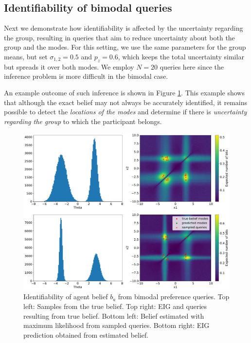 \documentclass[letterpaper]{article} %
\begin{document}
\subsection{Identifiability of bimodal queries}

Next we demonstrate how identifiability is affected by the uncertainty regarding the group, resulting in queries that aim to reduce uncertainty about both the group and the modes. For this setting, we use the same parameters for the group means, but set $\sigma_{1,2}=0.5$ and $p_z = 0.6$, which keeps the total uncertainty similar but spreads it over both modes. We employ $N=20$ queries here since the inference problem is more difficult in the bimodal case.

An example outcome of such inference is shown in Figure \ref{fig:bimodal_eig}. This example shows that although the exact belief may not always be accurately identified, it remains possible to detect the \textit{locations of the modes} and determine if there is \textit{uncertainty regarding the group} to which the participant belongs.

\begin{figure}[t]
\centering
\includegraphics[width=1.0\columnwidth]{bimodal_mle_3.pdf}
\caption{Identifiability of agent belief $b_a$ from bimodal preference queries. Top left: Samples from the true belief. Top right: EIG and queries resulting from true belief. Bottom left: Belief estimated with maximum likelihood from sampled queries. Bottom right: EIG prediction obtained from estimated belief.}
\label{fig:bimodal_eig}
\end{figure}
\end{document}
